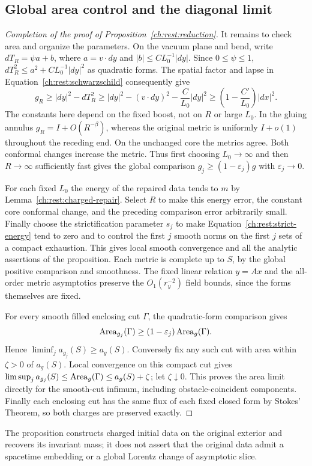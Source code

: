 \subsection{Global area control and the diagonal limit}

\begin{proof}[Completion of the proof of Proposition~\ref{ch:rest:reduction}]
It remains to check area and organize the parameters. On the vacuum
plane and bend, write $dT_R=\psi a+b$, where $a=v\cdot dy$ and
$|b|\le C L_0^{-1}|dy|$. Since $0\le\psi\le1$,
$dT_R^2\le a^2+C L_0^{-1}|dy|^2$ as quadratic forms. The spatial
factor and lapse in Equation~\eqref{ch:rest:schwarzschild} consequently
give
\begin{equation}
 \label{ch:rest:global-lower-comparison}
 g_R\ge |dy|^2-dT_R^2
 \ge|dy|^2-(v\cdot dy)^2-\frac C{L_0}|dy|^2
 \ge\left(1-\frac{C'}{L_0}\right)|dx|^2.
\end{equation}
The constants here depend on the fixed boost, not on $R$ or large
$L_0$. In the gluing annulus $g_R=I+O(R^{-\beta})$, whereas the
original metric is uniformly $I+o(1)$ throughout the receding end.
On the unchanged core the metrics agree. Both conformal changes
increase the metric. Thus first choosing $L_0\to\infty$ and then
$R\to\infty$ sufficiently fast gives the global comparison
$g_j\ge(1-\varepsilon_j)g$ with $\varepsilon_j\to0$.

For each fixed $L_0$ the energy of the repaired data tends to $m$ by
Lemma~\ref{ch:rest:charged-repair}. Select $R$ to make this energy error,
the constant core conformal change, and the preceding comparison error
arbitrarily small. Finally choose the strictification parameter $s_j$
to make Equation~\eqref{ch:rest:strict-energy} tend to zero and to control
the first $j$ smooth norms on the first $j$ sets of a compact exhaustion.
This gives local smooth convergence and all the analytic assertions of
the proposition. Each metric is complete up to $S$, by the global
positive comparison and smoothness. The fixed linear relation $y=Ax$
and the all-order metric asymptotics preserve the $O_1(r_y^{-2})$
field bounds, since the forms themselves are fixed.

For every smooth filled enclosing cut $\Gamma$, the quadratic-form
comparison gives
\[
 \operatorname{Area}_{g_j}(\Gamma)\ge(1-\varepsilon_j)\operatorname{Area}_g(\Gamma).
\]
Hence $\liminf_j a_{g_j}(S)\ge a_g(S)$. Conversely fix any such cut
with area within $\zeta>0$ of $a_g(S)$. Local convergence on this
compact cut gives
$\limsup_j a_{g_j}(S)\le\operatorname{Area}_g(\Gamma)\le a_g(S)+\zeta$;
let $\zeta\downarrow0$. This proves the area limit directly for the
smooth-cut infimum, including obstacle-coincident components.
Finally each enclosing cut has the same flux of each fixed closed
form by Stokes' Theorem, so both charges are preserved exactly.
\end{proof}

The proposition constructs charged initial data on the original exterior
and recovers its invariant mass;
it does not assert that the original data admit a spacetime embedding
or a global Lorentz change of asymptotic slice.

